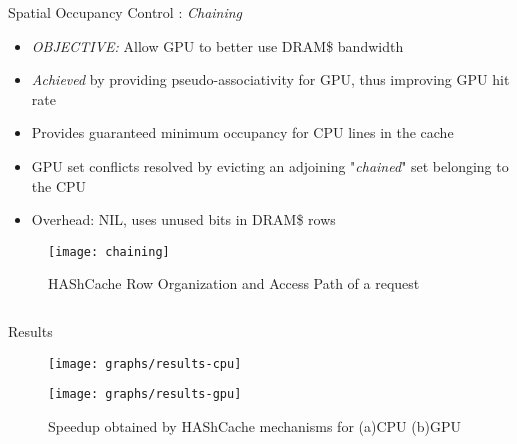 \documentclass[final,t]{beamer}
\newcommand*\circled[1]{\tikz[baseline=(char.base)]{
            \node[shape=circle,draw,inner sep=2pt] (char) {#1};}}
\begin{document}
\begin{frame}[t,fragile]{}
\begin{columns}[t]
\begin{column}{.48\linewidth}
\begin{tcolorbox}
    \begin{exampleblock}{\circled{3} Spatial Occupancy Control : \textit{Chaining}}
    	\begin{itemize}
	    	\item \emph{OBJECTIVE:} Allow GPU to better use DRAM\$ bandwidth
		    \item \emph{Achieved} by providing pseudo-associativity for GPU, thus improving GPU hit rate
		    \item Provides guaranteed minimum occupancy for CPU lines in the cache
	    	\item GPU set conflicts resolved by evicting an adjoining "\textit{chained}" set belonging to the CPU
		    \item Overhead: NIL, uses unused bits in DRAM\$ rows
	    \end{itemize}
	\vspace{\baselineskip}
    \centering
    \begin{figure}
    	\centering
        \def\svgwidth{0.31\linewidth}
        
        \hspace{0.38em}	
    	\texttt{[image: chaining]}
    	\caption{HAShCache Row Organization and Access Path of a request}
    \end{figure}
    \end{exampleblock}
          

\end{tcolorbox}
\end{column}

\end{columns}

    \vspace{1.5em}
        \begin{tcolorbox}[colback=red!5!white,
                          colframe=red!75!black,
                         ]
        \begin{columns}[t]
        \begin{column}{.48\linewidth}
       
	
		\begin{exampleblock}{Results}
        	\begin{figure}
				\texttt{[image: graphs/results-cpu]}
			\end{figure}
			\begin{figure}
			   	\texttt{[image: graphs/results-gpu]}
		  	    \caption{Speedup obtained by HAShCache mechanisms for (a)CPU (b)GPU}
			\end{figure} 
		\end{exampleblock}
		

\end{column}
\end{columns}
\end{tcolorbox}
\end{frame}
\end{document}
